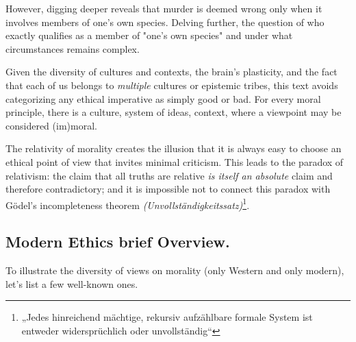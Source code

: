 \documentclass[11pt,a4]{article}
\begin{document}
    However, digging deeper reveals that murder is deemed wrong only when it involves members of one's
    own species. Delving further, the question of who exactly qualifies as a member of "one's own species"
    and under what circumstances remains complex.

    Given the diversity of cultures and contexts, the brain's plasticity, and the fact that each of us
    belongs to \textit{multiple} cultures or epistemic tribes, this text avoids categorizing any ethical
    imperative as simply good or bad. For every moral principle, there is a culture, system of ideas,
    context, where a viewpoint may be considered (im)moral.


    The relativity of morality creates the illusion that it is always
    easy to choose an ethical point of view that invites minimal criticism.
    This leads to the paradox of relativism\cite{Meiland1980-ho}: the claim
    that all truths
    are relative \textit{is itself an absolute} claim and therefore contradictory;
    and it is impossible not to connect this paradox with Gödel's
    incompleteness theorem \textit{(Unvollständigkeitssatz)}\footnote{„Jedes
    hinreichend mächtige, rekursiv aufzählbare formale System ist
    entweder widersprüchlich oder unvollständig“}.




\subsection{Modern Ethics brief Overview.}



        To illustrate the diversity of views on morality (only Western and only modern), let's list a
        few well-known ones.
\end{document}
